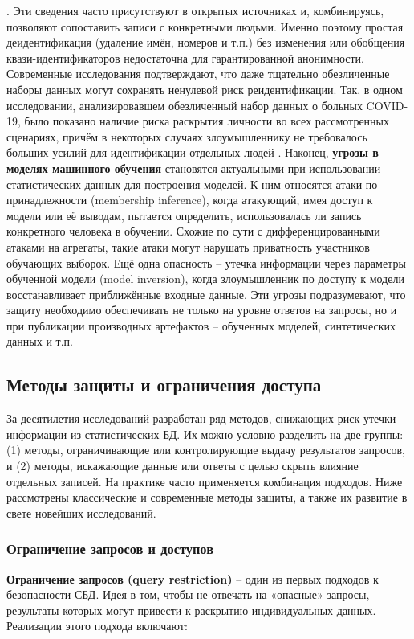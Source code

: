 . Эти сведения часто присутствуют в открытых источниках и, комбинируясь, позволяют сопоставить записи с конкретными людьми. Именно поэтому простая деидентификация (удаление имён, номеров и т.п.) без изменения или обобщения квази-идентификаторов недостаточна для гарантированной анонимности. Современные исследования подтверждают, что даже тщательно обезличенные наборы данных могут сохранять ненулевой риск реидентификации. Так, в одном исследовании, анализировавшем обезличенный набор данных о больных COVID-19, было показано наличие риска раскрытия личности во всех рассмотренных сценариях, причём в некоторых случаях злоумышленнику не требовалось больших усилий для идентификации отдельных людей
\autocite{journals-plos-org}
. Наконец, \textbf{угрозы в моделях машинного обучения} становятся актуальными при использовании статистических данных для построения моделей. К ним относятся атаки по принадлежности (membership inference), когда атакующий, имея доступ к модели или её выводам, пытается определить, использовалась ли запись конкретного человека в обучении. Схожие по сути с дифференцированными атаками на агрегаты, такие атаки могут нарушать приватность участников обучающих выборок. Ещё одна опасность – утечка информации через параметры обученной модели (model inversion), когда злоумышленник по доступу к модели восстанавливает приближённые входные данные. Эти угрозы подразумевают, что защиту необходимо обеспечивать не только на уровне ответов на запросы, но и при публикации производных артефактов – обученных моделей, синтетических данных и т.п. \subsection{Методы защиты и ограничения доступа}
За десятилетия исследований разработан ряд методов, снижающих риск утечки информации из статистических БД. Их можно условно разделить на две группы: (1) методы, ограничивающие или контролирующие выдачу результатов запросов, и (2) методы, искажающие данные или ответы с целью скрыть влияние отдельных записей. На практике часто применяется комбинация подходов. Ниже рассмотрены классические и современные методы защиты, а также их развитие в свете новейших исследований. \subsubsection{Ограничение запросов и доступов}
\textbf{Ограничение запросов (query restriction)} – один из первых подходов к безопасности СБД. Идея в том, чтобы не отвечать на «опасные» запросы, результаты которых могут привести к раскрытию индивидуальных данных. Реализации этого подхода включают:
